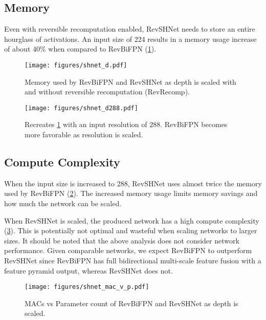 \documentclass{article}
\begin{document}
\subsection{Memory}
\label{appx:rev_sh:mem}

Even with reversible recomputation enabled, RevSHNet needs to store an entire hourglass of activations. An input size of 224 results in a memory usage increase of about 40\% when compared to RevBiFPN (\cref{fig:rev_sh:mem}).

\begin{figure}
    \centering
    \vskip -10pt
    \texttt{[image: figures/shnet\_d.pdf]}
    \vskip -10pt
    \caption{
        Memory used by RevBiFPN and RevSHNet as depth is scaled with and without reversible recomputation (RevRecomp).}
    \label{fig:rev_sh:mem}
    \vskip -10pt
\end{figure}


\begin{figure}
    \centering
    \texttt{[image: figures/shnet\_d288.pdf]}
    \vskip -10pt
    \caption{
        Recreates \cref{fig:rev_sh:mem} with an input resolution of 288.
        RevBiFPN becomes more favorable as resolution is scaled.}
    \label{fig:rev_sh:mem288}
    \vskip -10pt
\end{figure}

\subsection{Compute Complexity}
\label{appx:rev_sh:FLOP}

When the input size is increased to 288, RevSHNet uses almost twice the memory used by RevBiFPN (\cref{fig:rev_sh:mem288}). The increased memory usage limits memory savings and how much the network can be scaled.

When RevSHNet is scaled, the produced network has a high compute complexity (\cref{fig:rev_sh_mac_v_p}). This is potentially not optimal and wasteful when scaling networks to larger sizes. It should be noted that the above analysis does not consider network performance. Given comparable networks, we expect RevBiFPN to outperform RevSHNet since RevBiFPN has full bidirectional multi-scale feature fusion with a feature pyramid output, whereas RevSHNet does not.

\begin{figure}
    \centering
    \texttt{[image: figures/shnet\_mac\_v\_p.pdf]}
    \vskip -10pt
    \caption{MACs vs Parameter count of RevBiFPN and RevSHNet as depth is scaled.}
    \label{fig:rev_sh_mac_v_p}
\end{figure}
\end{document}
